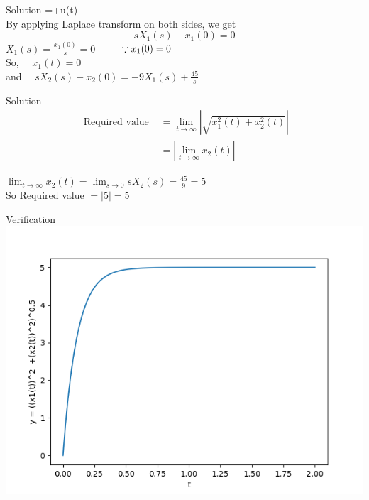 \documentclass{beamer}
\begin{document}
\begin{frame}{Solution}
=\left[\begin{array}{cc}
{0} & {0} \\
{0} & {-9}
\end{array}\right]\left[\begin{array}{l}
{x_{1}(t)} \\
{x_{2}(t)}
\end{array}\right]+\left[\begin{array}{c}
{0} \\
{45}
\end{array}\right] u(t) \vspace{5mm}\\
\text By applying Laplace transform on both sides, we get
$$
s X_{1}(s)-x_{1}(0)=0
$$
$X_{1}(s)=\frac{x_{1}(0)}{s}=0 \quad$     $\text \quad \because x_{1}(0)=0$
\\So, $\quad x_{1}(t)=0$\\
and $\quad s X_{2}(s)-x_{2}(0)=-9 X_{1}(s)+\frac{45}{s}$


\end{frame}

\begin{frame}{Solution}
$$
\begin{aligned}
\text { Required value } &=\lim _{t \rightarrow \infty}|\sqrt{x_{1}^{2}(t)+x_{2}^{2}(t)}| \\
&=\left|\lim _{t \rightarrow \infty} x_{2}(t)\right|
\end{aligned}
$$

$\lim _{t \rightarrow \infty} x_{2}(t)=\lim _{s \rightarrow 0} s X_{2}(s)=\frac{45}{9}=5$ \vspace{5mm}\\
$\mathrm{So}$
Required value $=|5|=5$
\end{frame}

\begin{frame}{Verification}
\includegraphics[scale=0.65]{gvv.png}

\end{frame}
\end{document}
